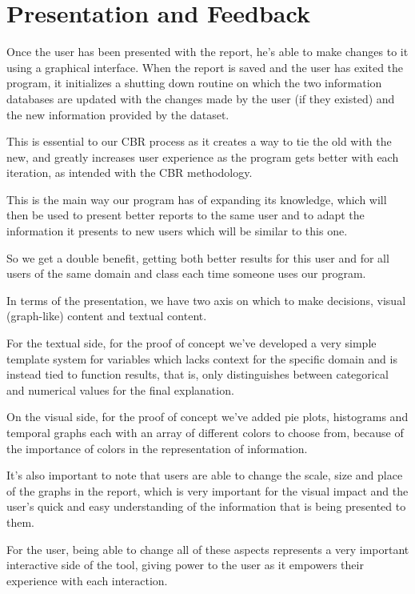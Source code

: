 \section{Presentation and Feedback}
\label{cap2:sec:feedback}

Once the user has been presented with the report, he's able to make changes to it using a graphical interface. When the report is saved and the user has exited the program, it initializes a shutting down routine on which the two information databases are updated with the changes made by the user (if they existed) and the new information provided by the dataset.

This is essential to our CBR process as it creates a way to tie the old with the new, and greatly increases user experience as the program gets better with each iteration, as intended with the CBR methodology.

This is the main way our program has of expanding its knowledge, which will then be used to present better reports to the same user and to adapt the information it presents to new users which will be similar to this one.

So we get a double benefit, getting both better results for this user and for all users of the same domain and class each time someone uses our program.

In terms of the presentation, we have two axis on which to make decisions, visual (graph-like) content and textual content.

For the textual side, for the proof of concept we've developed a very simple template system for variables which lacks context for the specific domain and is instead tied to function results, that is, only distinguishes between categorical and numerical values for the final explanation.

On the visual side, for the proof of concept we've added pie plots, histograms and temporal graphs each with an array of different colors to choose from, because of the importance of colors in the representation of information.

It's also important to note that users are able to change the scale, size and place of the graphs in the report, which is very important for the visual impact and the user's quick and easy understanding of the information that is being presented to them.

For the user, being able to change all of these aspects represents a very important interactive side of the tool, giving power to the user as it empowers their experience with each interaction.
